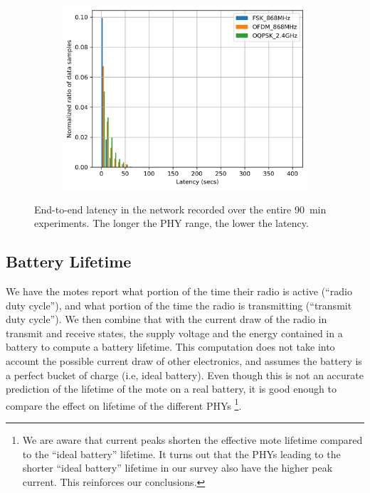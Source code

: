 \documentclass[sensors,article,submit,moreauthors,pdftex]{Definitions/mdpi}
\begin{document}
\begin{figure}[ht]
\begin{subfigure}[b]{.49\textwidth}
		\centering
    	\includegraphics[width=1.00\columnwidth]{latency_pdf}
    	\label{fig:latency_pdf}
\end{subfigure}
\hfill
\begin{minipage}[b]{.49\textwidth}
\caption{
	    End-to-end latency in the network recorded over the entire 90~min experiments.
	    The longer the PHY range, the lower the latency.
	}
	\label{fig:latency_all}
\end{minipage}

\end{figure}

\subsection{Battery Lifetime}
\label{sec:res_lifetime}


We have the motes report what portion of the time their radio is active (``radio duty cycle''), and what portion of the time the radio is transmitting (``transmit duty cycle'').
We then combine that with the current draw of the radio in transmit and receive states, the supply voltage and the energy contained in a battery to compute a battery lifetime.
This computation does not take into account the possible current draw of other electronics, and assumes the battery is a perfect bucket of charge (i.e, ideal battery).
Even though this is not an accurate prediction of the lifetime of the mote on a real battery, it is good enough to compare the effect on lifetime of the different PHYs 
    \footnote{We are aware that current peaks shorten the effective mote lifetime compared to the ``ideal battery'' lifetime.
    It turns out that the PHYs leading to the shorter ``ideal battery'' lifetime in our survey also have the higher peak current. This reinforces our conclusions.}.
\end{document}
